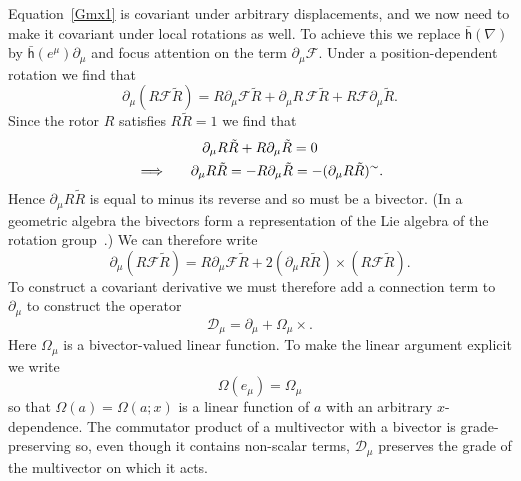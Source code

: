 \documentclass[a4paper]{article}
\numberwithin{equation}{section}
\newcommand{\hs}[1]{\hspace*{#1cm}}
\newcommand{\crs}{\! \times \!}
\newcommand{\tld}{\sim}
\newcommand{\eqv}{=}
\newcommand{\Om}{\Omega}
\newcommand{\cld}{{\mathcal{D}}}
\newcommand{\clf}{{\mathcal{F}}}
\newcommand{\dmu}{\partial_{\mu}}
\newcommand{\Rrev}{\tilde{R}}
\newcommand{\lbh}{\bar{\mathsf{h}}}
\newcommand{\ho}{\lbh}
\newcommand{\grad}{\nabla}
\begin{document}
Equation~\eqref{Gmx1} is covariant under arbitrary displacements, and we
now need to make it covariant under local rotations as well.  To
achieve this we replace $\ho(\grad)$ by $\ho(e^\mu)\dmu$ and focus
attention on the term $\dmu \clf$.  Under a position-dependent
rotation we find that
%
\begin{equation}
\dmu (R\clf\Rrev) = R \dmu \clf \Rrev + \dmu R \,
\clf\Rrev +R \clf \dmu \Rrev.
\end{equation} 
%
Since the rotor $R$ satisfies $R\Rrev=1$ we find that
%
\begin{gather}
\dmu R \Rrev + R \dmu \Rrev = 0 \\
\implies \hs{0.5} \dmu R \Rrev = - R \dmu \Rrev = -(
\dmu R \Rrev)^\tld .
\end{gather}
%
Hence $\dmu R \Rrev$ is equal to minus its reverse and so must be a
bivector.  (In a geometric algebra the bivectors form a representation
of the Lie algebra of the rotation group~\cite{dor93-spin}.)  We can
therefore write
%
\begin{equation}
\dmu (R\clf\Rrev) = R \dmu \clf \Rrev +2 (\dmu R \Rrev) \crs
(R\clf\Rrev). 
\end{equation} 
%
To construct a covariant derivative we must therefore add a
connection term to $\dmu$ to construct the operator
%
\begin{equation}
\cld_\mu \eqv \dmu + \Om_\mu \times.
\label{G5}
\end{equation} 
%
Here $\Om_\mu$ is a bivector-valued linear function.  To make
the linear argument explicit we write
%
\begin{equation}
\Om(e_\mu) = \Om_\mu
\end{equation}
%
so that $\Om(a)=\Om(a;x)$ is a linear function of $a$ with an
arbitrary $x$-dependence.  The commutator product of a multivector
with a bivector is grade-preserving so, even though it contains
non-scalar terms, $\cld_\mu$ preserves the grade of the multivector on
which it acts.
\end{document}
